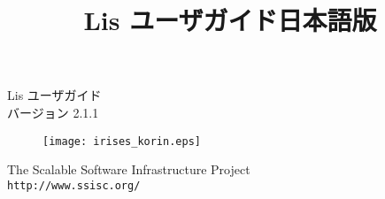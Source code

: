 \documentclass[a4paper]{jarticle}
\title{Lis ユーザガイド日本語版}
\author{}
\date{}
\begin{document}
\vspace*{4cm}
\begin{flushleft}
{\Large Lis ユーザガイド}\\
バージョン 2.1.1
\end{flushleft}

\vspace*{2cm}
\begin{figure}[h]
\texttt{[image: irises\_korin.eps]}
\end{figure}

\vspace*{2cm}
\begin{flushleft}
{\large The Scalable Software Infrastructure
Project\\
{\tt http://www.ssisc.org/}}\\
\end{flushleft}

\vspace*{5mm}
\thispagestyle{empty}
\end{document}

